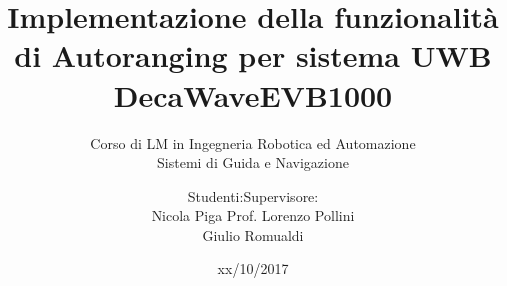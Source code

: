 \documentclass{beamer}
\date{xx/10/2017}
\title[]{Implementazione della funzionalità di Autoranging per sistema UWB DecaWaveEVB1000}
\subtitle{Corso di LM in Ingegneria Robotica ed Automazione \\
  Sistemi di Guida e Navigazione}
\author{Studenti:\hfill Supervisore:\\
Nicola Piga \hfill Prof. Lorenzo Pollini\\
Giulio Romualdi}
\institute[]{Università di Pisa}
\begin{document}

\begin{frame}
  \maketitle
\end{frame}
















\end{document}
